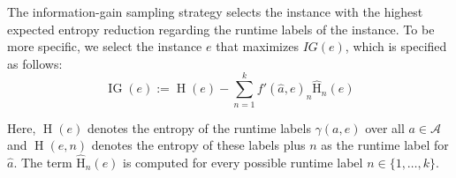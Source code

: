 \documentclass[runningheads]{llncs}
\begin{document}
The information-gain sampling strategy selects the instance with the highest expected entropy reduction regarding the runtime labels of the instance.
To be more specific, we select the instance $e$ that maximizes $IG(e)$, which is specified as follows:
%
\begin{equation*}
  \operatorname{IG}(e) := \operatorname{H}(e) - \sum_{n = 1}^{k} f'(\hat{a}, e)_{n} \operatorname{\hat H}_n(e)
\end{equation*}

Here, $\operatorname{H}(e)$ denotes the entropy of the runtime labels $\gamma(a, e)$ over all $a \in \mathcal{A}$ and $\operatorname{H}(e, n)$ denotes the entropy of these labels plus $n$ as the runtime label for $\hat{a}$.
The term $\operatorname{\hat H}_n(e)$ is computed for every possible runtime label $n \in \{1, \dots, k\}$.





\end{document}
